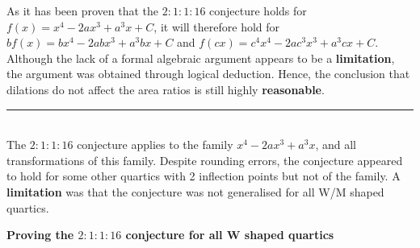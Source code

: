 \documentclass{homework}
\begin{document}
\begin{flushleft}
    As it has been proven that the $2:1:1:16$ conjecture holds for $f(x)=x^4-2ax^3+a^3x+C$, it will therefore hold for $bf(x)=bx^4-2abx^3+a^3bx+C$ and $f(cx)=c^4x^4-2ac^3x^3+a^3cx+C$. \vspace{0.8em}\\ 
    Although the lack of a formal algebraic argument appears to be a \textbf{limitation}, the argument was obtained through logical deduction. Hence, the conclusion that dilations do not affect the area ratios is still highly \textbf{reasonable}. \\
    \rule{45em}{0.2pt}
    \vspace{0.8em} \\
    The $2:1:1:16$ conjecture applies to the family $x^4-2ax^3+a^3x$, and all transformations of this family. Despite rounding errors, the conjecture appeared to hold for some other quartics with 2 inflection points but not of the family. A \textbf{limitation} was that the conjecture was not generalised for all W/M shaped quartics. 
\end{flushleft}
\vspace{1.6em}
\begin{center}
\textbf{\large{Proving the $2:1:1:16$ conjecture for all W shaped quartics}} \\
\vspace{0.9em}
\end{center}
\end{document}
